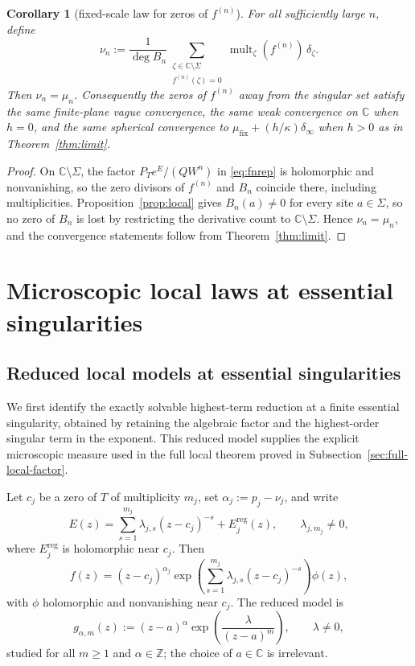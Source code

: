 \documentclass[reqno]{article}
\newtheorem{cor}[theorem]{Corollary}
\theoremstyle{definition}
\theoremstyle{remark}
\theoremstyle{plain}
\newcommand{\C}{\mathbb C}
\begin{document}
\begin{cor}[fixed-scale law for zeros of \(f^{(n)}\)]\label{cor:fixed-scale-derivative-zeros}
For all sufficiently large $n$, define
\[
\nu_n:=\frac{1}{\deg B_n}
\sum_{\substack{\zeta\in\C\setminus\Sigma\\ f^{(n)}(\zeta)=0}}
\operatorname{mult}_\zeta(f^{(n)})\,\delta_\zeta .
\]
Then $\nu_n=\mu_n$. Consequently the zeros of $f^{(n)}$ away from the singular set satisfy the same finite-plane vague convergence, the same weak convergence on $\C$ when $h=0$, and the same spherical convergence to $\mu_{\mathrm{fix}}+(h/\kappa)\delta_\infty$ when $h>0$ as in Theorem~\ref{thm:limit}.
\end{cor}

\begin{proof}
On $\C\setminus\Sigma$, the factor $P_Te^E/(QW^n)$ in \eqref{eq:fnrep} is holomorphic and nonvanishing, so the zero divisors of $f^{(n)}$ and $B_n$ coincide there, including multiplicities. Proposition~\ref{prop:local} gives $B_n(a)\ne0$ for every site $a\in\Sigma$, so no zero of $B_n$ is lost by restricting the derivative count to $\C\setminus\Sigma$. Hence $\nu_n=\mu_n$, and the convergence statements follow from Theorem~\ref{thm:limit}.
\end{proof}

\section{Microscopic local laws at essential singularities}\label{sec:microscopic}

\subsection{Reduced local models at essential singularities}\label{sec:local-models}

We first identify the exactly solvable highest-term reduction at a finite essential singularity, obtained by retaining the algebraic factor and the highest-order singular term in the exponent. This reduced model supplies the explicit microscopic measure used in the full local theorem proved in Subsection~\ref{sec:full-local-factor}.

Let $c_j$ be a zero of $T$ of multiplicity $m_j$, set $\alpha_j:=p_j-\nu_j$, and write
$$E(z)=\sum_{s=1}^{m_j}\lambda_{j,s}(z-c_j)^{-s}+E_j^{\mathrm{reg}}(z),\qquad \lambda_{j,m_j}\ne0,$$
where $E_j^{\mathrm{reg}}$ is holomorphic near $c_j$. Then
$$f(z)=(z-c_j)^{\alpha_j}\exp\!\left(\sum_{s=1}^{m_j}\lambda_{j,s}(z-c_j)^{-s}\right)\phi(z),$$
with $\phi$ holomorphic and nonvanishing near $c_j$. The reduced model is
$$g_{\alpha,m}(z):=(z-a)^\alpha \exp\!\left(\frac{\lambda}{(z-a)^m}\right),\qquad \lambda\ne0,$$
studied for all $m\ge1$ and $\alpha\in\mathbb Z$; the choice of $a\in\C$ is irrelevant.
\end{document}
